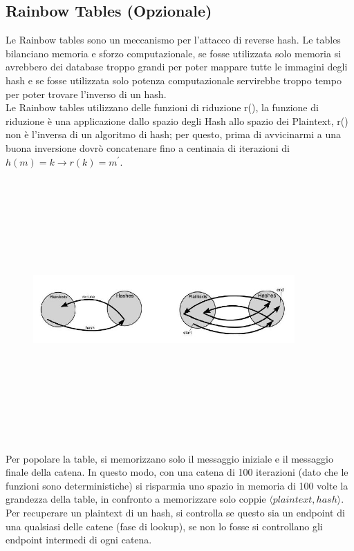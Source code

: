 \subsection{Rainbow Tables (Opzionale)}
Le Rainbow tables sono un meccanismo per l'attacco di reverse hash. Le tables bilanciano memoria e sforzo computazionale, se fosse utilizzata solo memoria si avrebbero dei database troppo grandi per poter mappare tutte le immagini degli hash e se fosse utilizzata solo potenza computazionale servirebbe troppo tempo per poter trovare l'inverso di un hash.\\
Le Rainbow tables utilizzano delle funzioni di riduzione r(), la funzione di riduzione è una applicazione dallo spazio degli Hash allo spazio dei Plaintext, r() non è l'inversa di un algoritmo di hash; per questo, prima di avvicinarmi a una buona inversione dovrò concatenare fino a centinaia di iterazioni di $h(m) = k \longrightarrow r(k) = m^{'}$.
\begin{figure}
	\begin{center}
	{\includegraphics[height=10cm, width=10cm, keepaspectratio]{Immagini/hash/riduzione.JPG}}
	\end{center}
\end{figure}
Per popolare la table, si memorizzano solo il messaggio iniziale e il messaggio finale della catena. In questo modo, con una catena di 100 iterazioni (dato che le funzioni sono deterministiche) si risparmia uno spazio in memoria di 100 volte la grandezza della table, in confronto a memorizzare solo coppie $\langle plaintext, hash \rangle$.
Per recuperare un plaintext di un hash, si controlla se questo sia un endpoint di una qualsiasi delle catene (fase di lookup), se non lo fosse si controllano gli endpoint intermedi di ogni catena.
